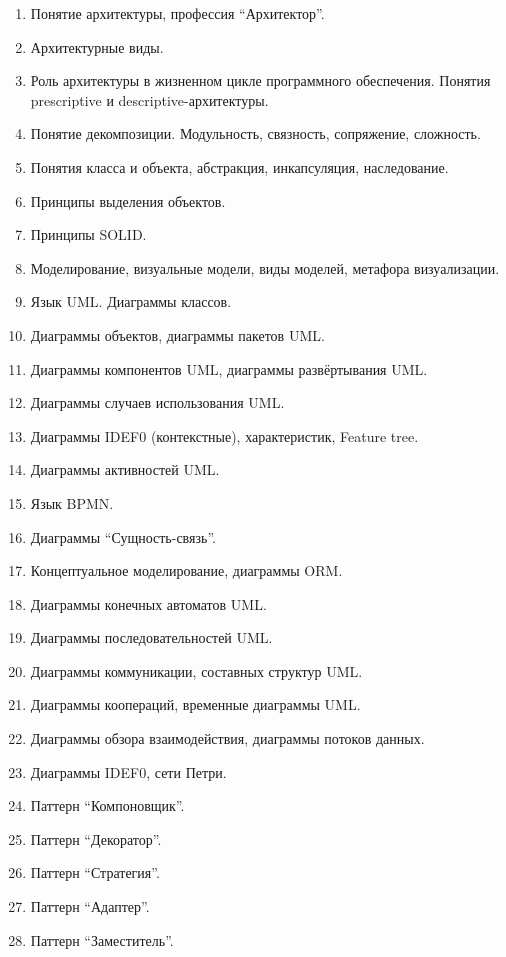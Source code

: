 \documentclass[a5paper]{article}
\begin{document}
\begin{enumerate}
    \item Понятие архитектуры, профессия \enquote{Архитектор}.
    \item Архитектурные виды.
    \item Роль архитектуры в жизненном цикле программного обеспечения. Понятия prescriptive и descriptive-архитектуры.
    \item Понятие декомпозиции. Модульность, связность, сопряжение, сложность.
    \item Понятия класса и объекта, абстракция, инкапсуляция, наследование. 
    \item Принципы выделения объектов.
    \item Принципы SOLID. %
    \item Моделирование, визуальные модели, виды моделей, метафора визуализации.
    \item Язык UML. Диаграммы классов.
    \item Диаграммы объектов, диаграммы пакетов UML.
    \item Диаграммы компонентов UML, диаграммы развёртывания UML.
    \item Диаграммы случаев использования UML.
    \item Диаграммы IDEF0 (контекстные), характеристик, Feature tree.
    \item Диаграммы активностей UML.
    \item Язык BPMN.
    \item Диаграммы \enquote{Сущность-связь}.
    \item Концептуальное моделирование, диаграммы ORM.
    \item Диаграммы конечных автоматов UML.
    \item Диаграммы последовательностей UML.
    \item Диаграммы коммуникации, составных структур UML.
    \item Диаграммы коопераций, временные диаграммы UML.
    \item Диаграммы обзора взаимодействия, диаграммы потоков данных.
    \item Диаграммы IDEF0, сети Петри.
    \item Паттерн \enquote{Компоновщик}.
    \item Паттерн \enquote{Декоратор}.
    \item Паттерн \enquote{Стратегия}.
    \item Паттерн \enquote{Адаптер}.
    \item Паттерн \enquote{Заместитель}.

\end{enumerate}
\end{document}
